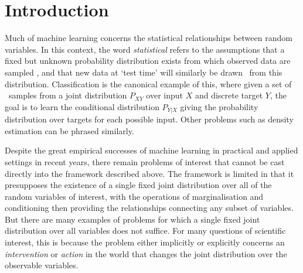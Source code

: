 

\section{Introduction}

Much of machine learning concerns the statistical relationships between random variables. In this context, the word \emph{statistical} refers to the assumptions that a fixed but unknown probability distribution exists from which observed data are sampled \iid, and that new data at `test time' will similarly be drawn \iid~from this distribution.
Classification is the canonical example of this, where given a set of \iid~samples from a joint distribution $P_{XY}$ over input $X$ and discrete target $Y$, the goal is to learn the conditional distribution $P_{Y|X}$ giving the probability distribution over targets for each possible input. Other problems such as density estimation can be phrased similarly.

Despite the great empirical successes of machine learning in practical and applied settings in recent years, there remain problems of interest that cannot be cast directly into the framework described above. 
The framework is limited in that it presupposes the existence of a single fixed joint distribution over all of the random variables of interest, with the operations of marginalisation and conditioning then providing the relationships connecting any subset of variables.
But there are many examples of problems for which a single fixed joint distribution over all variables does not suffice. 
For many questions of scientific interest, this is because the problem either implicitly or explicitly concerns an \emph{intervention} or \emph{action} in the world that changes the joint distribution over the observable variables.

